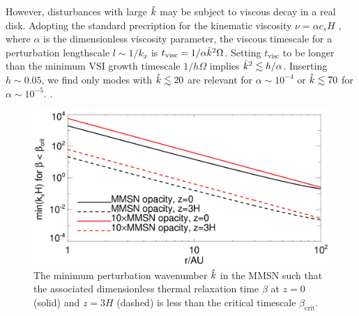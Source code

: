
However, disturbances with large $\hat{k}$ may be subject to viscous
decay in a real disk. Adopting the standard precription for the
kinematic viscosity $\nu = \alpha c_s H$ \citep{shakura73}, where
$\alpha$ is the dimensionless viscosity parameter, 
the viscous timescale for a perturbation lengthscale 
$l\sim 1/k_x$ is $t_\mathrm{visc} = 1/\alpha\hat{k}^2\Omega $. 
Setting $t_\mathrm{visc}$ to be longer than the
minimum VSI growth timescale $1/h\Omega$ implies 
$\hat{k}^2\lesssim h/\alpha$. Inserting $h \sim 0.05$,
we find only modes with $\hat{k}\lesssim 20$ are relevant for
$\alpha\sim 10^{-4}$ or $\hat{k}\lesssim 70$ for $\alpha\sim
10^{-5}$. .


\begin{figure}
  \includegraphics[width=\linewidth]{figures/bcrit_mink} 
  \caption{The minimum perturbation wavenumber $\hat{k}$ in
    the MMSN such that the associated dimensionless thermal
    relaxation time $\beta$ at $z=0$ (solid) and $z=3H$ (dashed) is
    less than the critical timescale $\beta_\mathrm{crit}$.   
    \label{mmsn_bcrit_bcool_mink}}   
\end{figure}  

